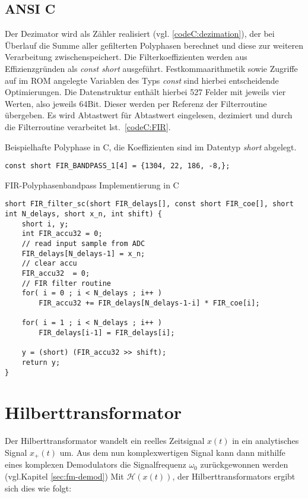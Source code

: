 \documentclass{article}
\begin{document}
\subsection{ANSI C}
Der Dezimator wird als Zähler realisiert (vgl. \ref{codeC:dezimation}), der bei Überlauf die Summe aller gefilterten Polyphasen berechnet und diese zur weiteren Verarbeitung zwischenspeichert. Die Filterkoeffizienten werden aus Effizienzgründen als \textit{const short} ausgeführt. Festkommaarithmetik sowie Zugriffe auf im ROM angelegte Variablen des Typs \textit{const} sind hierbei entscheidende Optimierungen.
Die Datenstruktur enthält hierbei 527 Felder mit jeweils vier Werten, also jeweils 64Bit. Dieser werden per Referenz der Filterroutine übergeben. Es wird Abtastwert für Abtastwert eingelesen, dezimiert und durch die Filterroutine verarbeitet lst.~\ref{codeC:FIR}.
\begin{listing}\label{codeC:dezimation}
    \caption{Beispielhafte Polyphase in C, die Koeffizienten sind im Datentyp \textit{short} abgelegt.}
    \begin{verbatim}
const short FIR_BANDPASS_1[4] = {1304, 22, 186, -8,};
    \end{verbatim}
\end{listing}
\begin{listing}\label{codeC:FIR}
    \caption{FIR-Polyphasenbandpass Implementierung in C}
    \begin{verbatim}
short FIR_filter_sc(short FIR_delays[], const short FIR_coe[], short int N_delays, short x_n, int shift) {
    short i, y;
    int FIR_accu32 = 0;
    // read input sample from ADC
    FIR_delays[N_delays-1] = x_n;	 
    // clear accu
    FIR_accu32	= 0;
    // FIR filter routine				
    for( i = 0 ; i < N_delays ; i++ )		
        FIR_accu32 += FIR_delays[N_delays-1-i] * FIR_coe[i];
    
    for( i = 1 ; i < N_delays ; i++ )				
        FIR_delays[i-1] = FIR_delays[i];

    y = (short) (FIR_accu32 >> shift);
    return y;
}
    \end{verbatim}
\end{listing}

\section{Hilberttransformator}\label{sec:hilbert}
Der Hilberttransformator wandelt ein reelles Zeitsignal $x(t)$ in ein analytisches Signal $x_+(t)$ um.
Aus dem nun komplexwertigen Signal kann dann mithilfe eines komplexen Demodulators die Signalfrequenz $\omega_0$ zurückgewonnen werden (vgl.Kapitel \ref{sec:fm-demod})
Mit $\mathcal{H}(x(t))$, der Hilberttransformators ergibt sich dies wie folgt:
\end{document}
